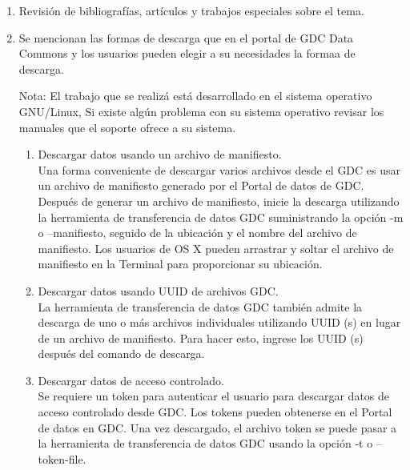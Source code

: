 \documentclass[10pt,a4paper]{article}
\begin{document}
\begin{enumerate}





\item Revisi\'on de bibliograf\'ias, art\'iculos y trabajos especiales sobre el tema.



\item Se mencionan las formas de descarga que en el portal de GDC Data Commons y los usuarios pueden elegir a su necesidades la formaa de descarga.


Nota: El trabajo que se realiz\'a est\'a desarrollado en el sistema operativo GNU/Linux, Si existe alg\'un problema con su sistema operativo revisar los manuales que el soporte ofrece a su sistema. 

\begin{enumerate}


		\item Descargar datos usando un archivo de manifiesto.
		\\
	
Una forma conveniente de descargar varios archivos desde el GDC es usar un archivo de manifiesto generado por el Portal de datos de GDC. Despu\'es de generar un archivo de manifiesto, inicie la descarga utilizando la herramienta de transferencia de datos GDC suministrando la opci\'on -m o --manifiesto, seguido de la ubicaci\'on y el nombre del archivo de manifiesto. Los usuarios de OS X pueden arrastrar y soltar el archivo de manifiesto en la Terminal para proporcionar su ubicaci\'on.


		\item Descargar datos usando UUID de archivos GDC.
		\\
	
La herramienta de transferencia de datos GDC tambi\'en admite la descarga de uno o m\'as archivos individuales utilizando UUID (s) en lugar de un archivo de manifiesto. Para hacer esto, ingrese los UUID (s) despu\'es del comando de descarga.

		\item Descargar datos de acceso controlado.
		\\
	
Se requiere un token para autenticar el usuario para descargar datos de acceso controlado desde GDC. Los tokens pueden obtenerse en el Portal de datos en GDC. Una vez descargado, el archivo token se puede pasar a la herramienta de transferencia de datos GDC usando la opci\'on -t o --token-file.



\end{enumerate}
\end{enumerate}
\end{document}
